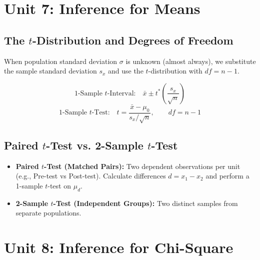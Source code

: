 \documentclass[11pt,oneside,openany]{book}
\begin{document}
\chapter{Unit 7: Inference for Means}

\section{The $t$-Distribution and Degrees of Freedom}
When population standard deviation $\sigma$ is unknown (almost always), we substitute the sample standard deviation $s_x$ and use the $t$-distribution with $df = n - 1$.

\begin{equation}
  \text{1-Sample } t\text{-Interval:} \quad \bar{x} \pm t^* \left(\frac{s_x}{\sqrt{n}}\right)
\end{equation}
\begin{equation}
  \text{1-Sample } t\text{-Test:} \quad t = \frac{\bar{x} - \mu_0}{s_x / \sqrt{n}}, \qquad df = n - 1
\end{equation}

\section{Paired $t$-Test vs. 2-Sample $t$-Test}
\begin{itemize}[leftmargin=1.2em]
  \item \textbf{Paired $t$-Test (Matched Pairs):} Two dependent observations per unit (e.g., Pre-test vs Post-test). Calculate differences $d = x_1 - x_2$ and perform a 1-sample $t$-test on $\mu_d$.
  \item \textbf{2-Sample $t$-Test (Independent Groups):} Two distinct samples from separate populations.
\end{itemize}

\chapter{Unit 8: Inference for Chi-Square}
\end{document}
